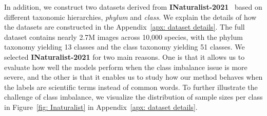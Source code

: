 \documentclass[10pt]{article} %
\begin{document}
In addition, we construct two datasets derived from \textbf{INaturalist-2021}~\citep{inaturalist21} based on different taxonomic hierarchies, {\em phylum} and {\em class}. We explain the details of how the datasets are constructed in the Appendix~\ref{apx: dataset details}.
The full dataset contains nearly 2.7M images across 10,000 species, with the phylum taxonomy yielding 13 classes and the class taxonomy yielding 51 classes.
We selected \textbf{INaturalist-2021} for two main reasons.
One is that it allows us to evaluate how well the models perform when the class imbalance issue is more severe, and the other is that it enables us to study how our method behaves when the labels are scientific terms instead of common words.
To further illustrate the challenge of class imbalance, we visualize the distribution of sample sizes per class in Figure~\ref{fig: Inaturalist} in Appendix~\ref{apx: dataset details}.

\end{document}
